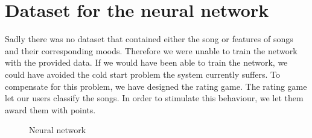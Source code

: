 \section{Dataset for the neural network}
Sadly there was no dataset that contained either the song or features of songs and their corresponding moods.
Therefore we were unable to train the network with the provided data.
If we would have been able to train the network, we could have avoided the cold start problem the system currently suffers.
To compensate for this problem, we have designed the rating game.
The rating game let our users classify the songs.
In order to stimulate this behaviour, we let them award them with points.

\begin{figure}
    \caption{Neural network}
    \label{neural-network-graph}
	\centering
	\def\svgwidth{2in}
	
\end{figure}

